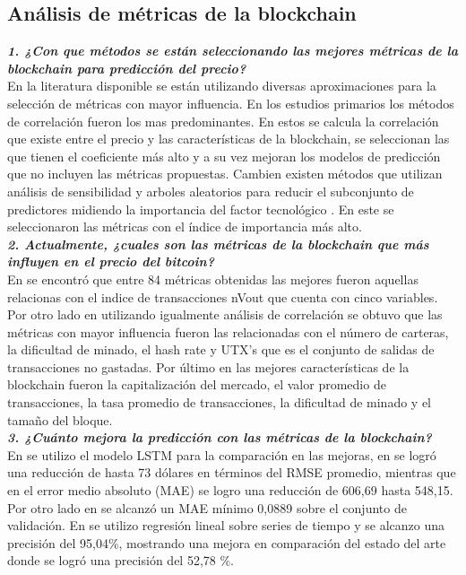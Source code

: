 \subsection{Análisis de métricas de la blockchain}

\textbf{\textit{1. ¿Con que métodos se están seleccionando las mejores métricas de la blockchain para predicción del precio?}}\\
En la literatura disponible se están utilizando diversas aproximaciones para la selección de métricas con mayor influencia. En los estudios primarios los métodos de correlación \cite{jiBestFeatureSelection2019,saadCharacterizingBlockchainbasedCryptocurrencies2018} fueron los mas predominantes. En estos se calcula la correlación que existe entre el precio y las características de la blockchain, se seleccionan las que tienen el coeficiente más alto y a su vez mejoran los modelos de predicción que no incluyen las métricas propuestas.
Cambien existen métodos que utilizan análisis de sensibilidad y arboles aleatorios para reducir el subconjunto de predictores midiendo la importancia del factor tecnológico \cite{chenMachineLearningModel2021}. En este se seleccionaron las métricas con el índice de importancia más alto.\\

\textbf{\textit{2. Actualmente, ¿cuales son las métricas de la blockchain que más influyen en el precio del bitcoin?}}\\
En \cite{jiBestFeatureSelection2019} se encontró que entre 84 métricas obtenidas las mejores fueron aquellas relacionas con el indice de transacciones nVout que cuenta con cinco variables.
Por otro lado en \cite{saadCharacterizingBlockchainbasedCryptocurrencies2018} utilizando igualmente análisis de correlación se obtuvo que las métricas con mayor influencia fueron las relacionadas con el número de carteras, la dificultad de minado, el hash rate y UTX's que es el conjunto de salidas de transacciones no gastadas.
Por último en \cite{chenMachineLearningModel2021} las mejores características de la blockchain fueron la capitalización del mercado, el valor promedio de transacciones, la tasa promedio de transacciones, la dificultad de minado y el tamaño del bloque.\\

\textbf{\textit{3. ¿Cuánto mejora la predicción con las métricas de la blockchain?}}\\
En \cite{saadCharacterizingBlockchainbasedCryptocurrencies2018,chenMachineLearningModel2021} se utilizo el modelo LSTM para la comparación en las mejoras, en \cite{chenMachineLearningModel2021} se logró una reducción de hasta 73 dólares en términos del RMSE promedio, mientras que en el error medio absoluto (MAE) se logro una reducción de 606,69 hasta 548,15. Por otro lado en \cite{saadCharacterizingBlockchainbasedCryptocurrencies2018} se alcanzó un MAE mínimo 0,0889 sobre el conjunto de validación.
En \cite{jiBestFeatureSelection2019} se utilizo regresión lineal sobre series de tiempo y se alcanzo una precisión del 95,04\%, mostrando una mejora en comparación del estado del arte \cite{mcnallyPredictingPriceBitcoin2018} donde se logró una precisión del 52,78 \%.

